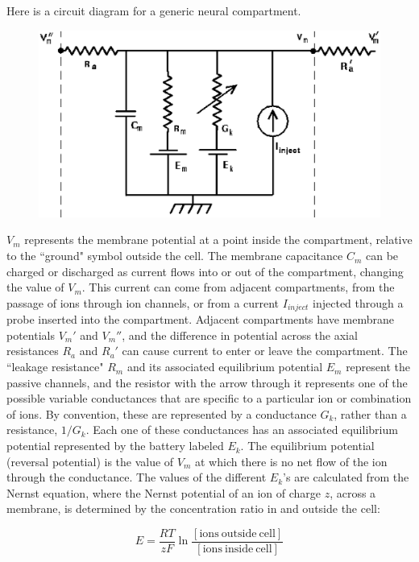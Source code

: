 \documentclass[12pt]{article}
\begin{document}
Here is a circuit diagram for a generic neural compartment.

\begin{figure}[h]
  \centering
 \includegraphics[scale=0.5]{figs/compt.eps}
  \label{fig:compt}
\end{figure}

$V_m$ represents the membrane potential at a point inside the compartment, relative to the ``ground" symbol outside the cell. The membrane capacitance $C_m$ can be charged or discharged as current flows into or out of the compartment, changing the value of $V_m$. This current can come from adjacent compartments, from the passage of ions through ion channels, or from a current $I_{inject}$ injected through a probe inserted into the compartment. Adjacent compartments have membrane potentials $V_m'$ and $V_m''$, and the difference in potential across the axial resistances $R_a$ and $R_a'$ can cause current to enter or leave the compartment. The ``leakage resistance" $R_m$ and its associated equilibrium potential $E_m$ represent the passive channels, and the resistor with the arrow through it represents one of the possible variable conductances that are specific to a particular ion or combination of ions. By convention, these are represented by a conductance $G_k$, rather than a resistance, $1/G_k$. Each one of these conductances has an associated equilibrium potential represented by the battery labeled $E_k$. The equilibrium potential (reversal potential) is the value of $V_m$ at which there is no net flow of the ion through the conductance. The values of the different $E_k$'s are calculated from the Nernst equation, where the Nernst potential of an ion of charge $z$, across a membrane, is determined by the concentration ratio in and outside the cell:

\begin{displaymath}
    E = \frac{R T}{z F} \ln\frac{[\mathrm{ions~outside~cell}]}{[\mathrm{ions~inside~cell}]}
\end{displaymath}
\end{document}
